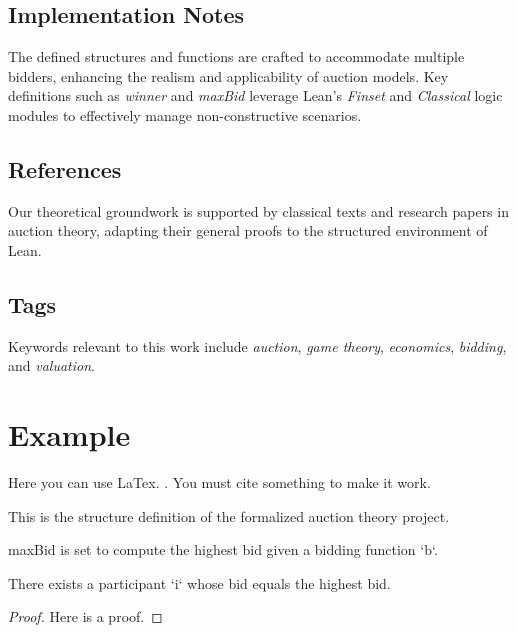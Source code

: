 \subsection{Implementation Notes}

The defined structures and functions are crafted to accommodate multiple bidders, enhancing the realism and applicability of auction models. Key definitions such as \textit{winner} and \textit{maxBid} leverage Lean's \textit{Finset} and \textit{Classical} logic modules to effectively manage non-constructive scenarios.

\subsection{References}

Our theoretical groundwork is supported by classical texts and research papers in auction theory, adapting their general proofs to the structured environment of Lean.

\subsection{Tags}

Keywords relevant to this work include \textit{auction}, \textit{game theory}, \textit{economics}, \textit{bidding}, and \textit{valuation}.



\section{Example}
Here you can use LaTex. \cite{marcus}. You must cite something to make it work.

\begin{definition}\label{Auction}
    \leanok
    This is the structure definition of the formalized auction theory project.
\end{definition}

\begin{definition}\label{maxBid}
    \leanok
    maxBid is set to compute the highest bid given a bidding function `b`.
\end{definition}

\begin{lemma}\label{exists_maxBid}
    \leanok
    There exists a participant `i` whose bid equals the highest bid.
\end{lemma}
\begin{proof}
    Here is a proof.
\end{proof}


